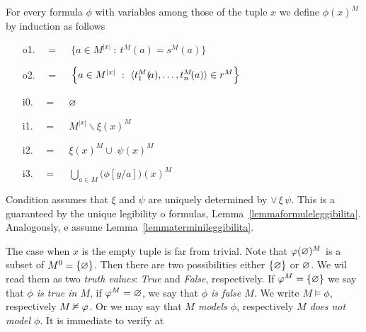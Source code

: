 \begin{definition}[of truth]\label{defverita} For every formula $\phi$ with variables among those of the tuple $x$ we define \emph{$\phi(x)^M$\/} by induction as follows
\begin{itemize}
\item[o1.] \hspace*{15ex}\ \  =\ \ \  $\Big\{a\in M^{|x|}\ :\ t^M\!(a)=s^M\!(a) \Big\}$\medskip

\item[o2.] \hspace*{15ex}\ \   =\ \ \ $\Big\{a\in M^{|x|}\ :\ \<t_1^M(\!a),\dots,t_n^M\!(a)\>\in r^M\Big\}$\medskip

\item[i0.] \hspace*{15ex}\ \  =\ \ \  $\varnothing$\bigskip

\item[i1.] \hspace*{15ex}\ \   =\ \ \  $M^{|x|}\smallsetminus\xi(x)^M$\bigskip

\item[i2.] \hspace*{15ex}\ \   =\ \ \  $\xi(x)^M\cup\;\psi(x)^M$\bigskip

\item[i3.] \hspace*{15ex}\ \   =\ \ \ $\displaystyle\bigcup_{a\in M}\big(\phi[y/a]\big)(x)^M$
\end{itemize}
Condition  assumes that $\xi$ and $\psi$ are uniquely determined by $\vee\,\xi\,\psi$. This is a guaranteed by the unique legibility o formulas, Lemma~\ref{lemmaformuleleggibilita}. Analogously,  e  assume Lemma~\ref{lemmaterminileggibilita}. 
\end{definition}

The case when $x$ is the empty tuple is far from trivial. Note that $\varphi(\varnothing)^M$ is a subset of $M^0=\{\varnothing\}$. Then there are two possibilities either $\{\varnothing\}$ or $\varnothing$. We wil read them as two \emph{truth values}: \emph{True\/} and \emph{False}, respectively. If $\varphi^M=\{\varnothing\}$ we say that \emph{$\phi$ is true in $M$}, if $\varphi^M=\varnothing$, we say that \emph{$\phi$ is false $M$}. We write \emph{$M\models\phi$}, respectively \emph{$M\nvDash\varphi$}. Or we may say that \emph{$M$ models $\phi$}, respectively \emph{$M$ does not model $\phi$}. It is immediate to verify at


